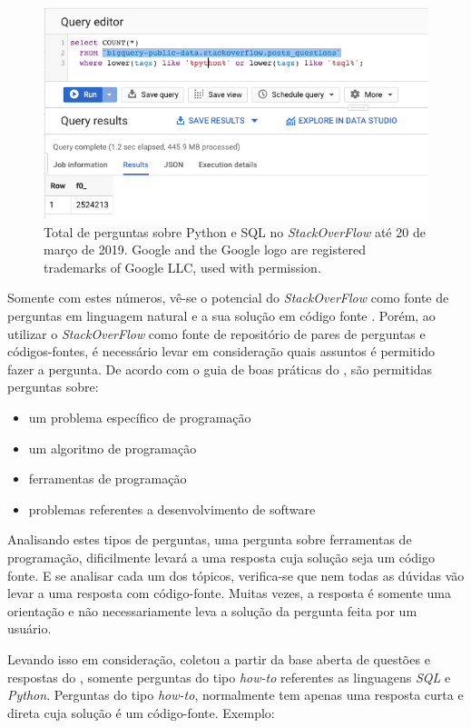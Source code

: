 \begin{figure}[h]
\includegraphics[width=12cm]{src/figuras/cap-problema/post-questions-python-sql-total.png}
\caption{Total de perguntas sobre Python e SQL no \textit{StackOverFlow} até 20 de março de 2019. Google and the Google logo are registered trademarks of Google LLC, used with permission.}
\label{fig:bigquery-total-questions-python-sql-stackoverflow}
\end{figure}

Somente com estes números, vê-se o potencial do \textit{StackOverFlow} como fonte de perguntas em linguagem natural e a sua solução em código fonte \cite{yao-2018}. Porém, ao utilizar o \textit{StackOverFlow} como fonte de repositório de pares de perguntas e códigos-fontes, é necessário levar em consideração quais assuntos é permitido fazer a pergunta. De acordo com o guia de boas práticas do \cite{stackoverflow-questions-topics-2019}, são permitidas perguntas sobre:

\begin{itemize}
    \item um problema específico de programação
    \item um algoritmo de programação
    \item ferramentas de programação
    \item problemas referentes a desenvolvimento de software
\end{itemize}

Analisando estes tipos de perguntas, uma pergunta sobre ferramentas de programação, dificilmente levará a uma resposta cuja solução seja um código fonte. E se analisar cada um dos tópicos, verifica-se que nem todas as dúvidas vão levar a uma resposta com código-fonte. Muitas vezes, a resposta é somente uma orientação e não necessariamente leva a solução da pergunta feita por um usuário.

Levando isso em consideração, \citeauthor{yao-2018} coletou a partir da base aberta de questões e respostas do \cite{stackoverflow-questions-topics-2019}, somente perguntas do tipo \textit{how-to} referentes as linguagens \textit{SQL} e \textit{Python}. Perguntas do tipo \textit{how-to}, normalmente tem apenas uma resposta curta e direta cuja solução é um código-fonte. Exemplo:

